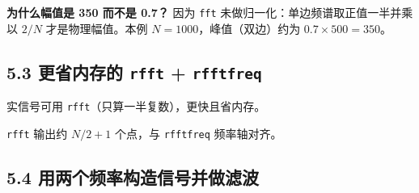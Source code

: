 \begin{Shaded}
\begin{Highlighting}[]
\end{Highlighting}
\end{Shaded}

\textbf{为什么幅值是 350 而不是 0.7？} 因为 \texttt{fft}
未做归一化：单边频谱取正值一半并乘以 \(2/N\) 才是物理幅值。本例
\(N=1000\)，峰值（双边）约为 \(0.7\times500=350\)。

\subsection{\texorpdfstring{5.3 更省内存的 \texttt{rfft} +
\texttt{rfftfreq}}{5.3 更省内存的 rfft + rfftfreq}}\label{ux66f4ux7701ux5185ux5b58ux7684-rfft-rfftfreq}

实信号可用 \texttt{rfft}（只算一半复数），更快且省内存。

\begin{Shaded}
\begin{Highlighting}[]
\OperatorTok{=}
\OperatorTok{=}\OperatorTok{/}
\NormalTok{(}\SpecialCharTok{\{}\NormalTok{freqs[np.argmax(np.}\NormalTok{(Yr))]}\NormalTok{)}
\NormalTok{(}\SpecialCharTok{\{}\SpecialCharTok{\}}\SpecialCharTok{\{}\SpecialCharTok{\}}\NormalTok{)}
\end{Highlighting}
\end{Shaded}

\begin{Shaded}
\begin{Highlighting}[]
\end{Highlighting}
\end{Shaded}

\texttt{rfft} 输出约 \(N/2+1\) 个点，与 \texttt{rfftfreq} 频率轴对齐。

\subsection{5.4
用两个频率构造信号并做滤波}\label{ux7528ux4e24ux4e2aux9891ux7387ux6784ux9020ux4fe1ux53f7ux5e76ux505aux6ee4ux6ce2}

